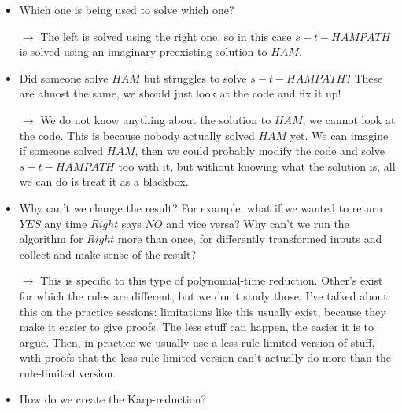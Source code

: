 \begin{itemize}
    \item Which one is being used to solve which one?
    
    $\rightarrow$ The left is solved using the right one, so in this case $s-t-HAMPATH$ is solved using an imaginary preexisting solution to $HAM$.
    \item Did someone solve $HAM$ but struggles to solve $s-t-HAMPATH$? These are almost the same, we should just look at the code and fix it up!
    
    $\rightarrow$ We do not know anything about the solution to $HAM$, we cannot look at the code. This is because nobody actually solved $HAM$ yet. We can imagine if someone solved $HAM$, then we could probably modify the code and solve $s-t-HAMPATH$ too with it, but without knowing what the solution is, all we can do is treat it as a blackbox.
    
    \item Why can't we change the result? For example, what if we wanted to return $YES$ any time $Right$ says $NO$ and vice versa? Why can't we run the algorithm for $Right$ more than once, for differently transformed inputs and collect and make sense of the result?
     
    $\rightarrow$ This is specific to this type of polynomial-time reduction. Other's exist for which the rules are different, but we don't study those. I've talked about this on the practice sessions: limitations like this usually exist, because they make it easier to give proofs. The less stuff can happen, the easier it is to argue. Then, in practice we usually use a less-rule-limited version of stuff, with proofs that the less-rule-limited version can't actually do more than the rule-limited version.
    
    \item How do we create the Karp-reduction?
    

\end{itemize}

